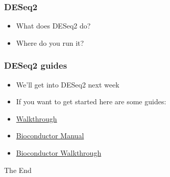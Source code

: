 \documentclass[14pt,handout]{beamer}
\begin{document}
\begin{frame}
\frametitle{DESeq2}
\begin{itemize}
	\item<+-> What does DESeq2 do?
	\item<+-> Where do you run it?
\end{itemize}
\end{frame}

\begin{frame}
\frametitle{DESeq2 guides}
\begin{itemize}
	\item<+-> We'll get into DESeq2 next week
	\item<+-> If you want to get started here are some guides:
	\item<+-> \href{http://bioconductor.org/packages/devel/bioc/vignettes/DESeq2/inst/doc/DESeq2.html}{Walkthrough}
	\item<+-> \href{https://www.bioconductor.org/packages/release/bioc/html/DESeq2.html}{Bioconductor Manual} 
	\item<+-> \href{https://www.bioconductor.org/help/workflows/rnaseqGene/}{Bioconductor Walkthrough}
\end{itemize}
\end{frame}


\begin{frame}
\Huge{\centerline{The End}}
\end{frame}

\end{document}
